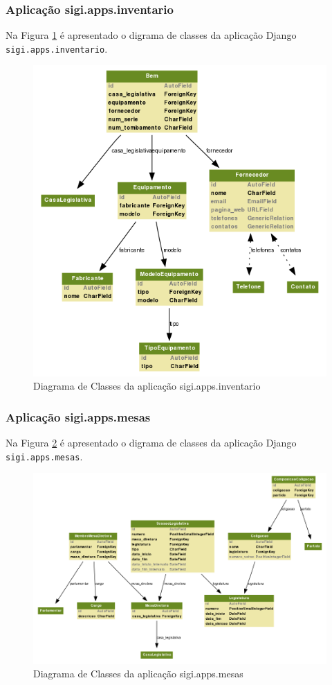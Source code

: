\subsubsection{Aplicação sigi.apps.inventario}
Na Figura \ref{fig:inventario} é apresentado o digrama de classes da
aplicação Django \verb|sigi.apps.inventario|.

\begin{figure}[h]
  \centering
  \includegraphics[width=120mm]{../imagens/inventario.png}
  \caption{Diagrama de Classes da aplicação sigi.apps.inventario}
  \label{fig:inventario}
\end{figure}

\subsubsection{Aplicação sigi.apps.mesas}
Na Figura \ref{fig:mesas} é apresentado o digrama de classes da
aplicação Django \verb|sigi.apps.mesas|.

\begin{figure}[h]
  \centering
  \includegraphics[width=145mm]{../imagens/mesas.png}
  \caption{Diagrama de Classes da aplicação sigi.apps.mesas}
  \label{fig:mesas}
\end{figure}

